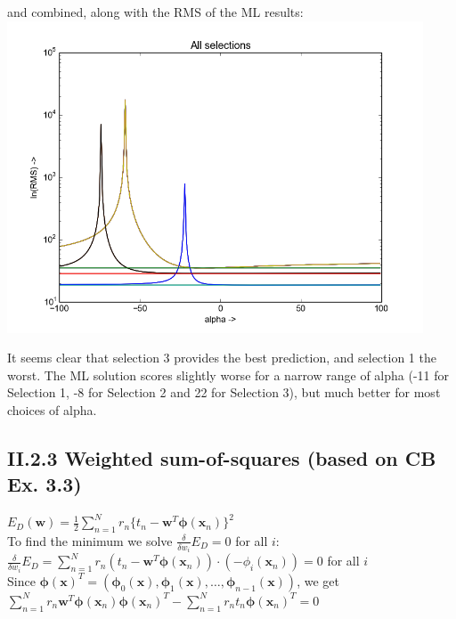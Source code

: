 \documentclass{article}
\theoremstyle{dotless}
\newcounter{min}
\begin{document}
and combined, along with the RMS of the ML results:\\

\includegraphics[keepaspectratio=true, width=350pt]{src/img/selall.png}

It seems clear that selection 3 provides the best prediction, and selection 1 the worst. The ML solution scores slightly worse for a narrow range of alpha (-11 for Selection 1, -8 for Selection 2 and 22 for Selection 3), but much better for most choices of alpha.


\subsection{II.2.3 Weighted sum-of-squares (based on CB Ex. 3.3)}

$E_D(\mathbf{w})=\frac{1}{2}\sum_{n=1}^Nr_n\{t_n-\mathbf{w}^T\mathbf{\phi}(\mathbf{x}_n)\}^2$\\

To find the minimum we solve $\frac{\delta}{\delta w_i}E_D=0$ for all $i$:\\

$\frac{\delta}{\delta w_i}E_D=\sum_{n=1}^Nr_n(t_n-\mathbf{w}^T\mathbf{\phi}(\mathbf{x}_n))\cdot(-\phi_i(\mathbf{x}_n))=0$ for all $i$\\

Since $\mathbf{\phi}(\mathbf{x})^T=(\mathbf{\phi}_0(\mathbf{x}),\mathbf{\phi}_1(\mathbf{x}),\dots,\mathbf{\phi}_{n-1}(\mathbf{x}))$, we get\\

$\sum_{n=1}^Nr_n\mathbf{w}^T\mathbf{\phi}(\mathbf{x}_n)\mathbf{\phi}(\mathbf{x}_n)^T-\sum_{n=1}^Nr_nt_n\mathbf{\phi}(\mathbf{x}_n)^T=0$\\
\end{document}
